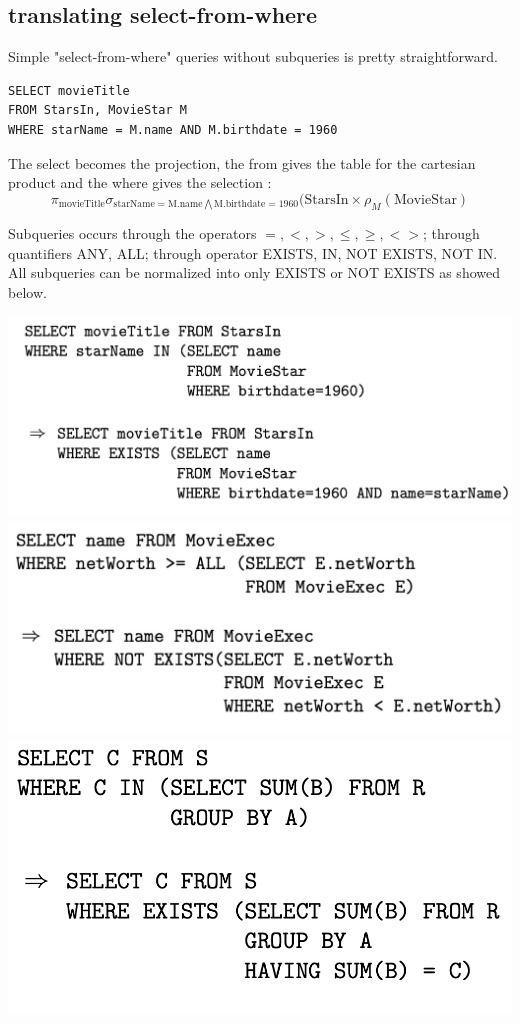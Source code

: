 \documentclass[12pt,a4paper]{article}
\begin{document}
\subsection{translating select-from-where}
Simple "select-from-where" queries without subqueries is pretty straightforward.
\begin{verbatim}
SELECT movieTitle
FROM StarsIn, MovieStar M
WHERE starName = M.name AND M.birthdate = 1960
\end{verbatim}
The select becomes the projection, the from gives the table for the cartesian product and the where gives the selection :
$$\pi_{\text{movieTitle}}\sigma_{\text{starName}=\text{M.name}\bigwedge \text{M.birthdate}=1960}(\text{StarsIn} \times \rho_M (\text{MovieStar})$$

Subqueries occurs through the operators $=,<,>,\leqslant, \geqslant, <>$; through quantifiers ANY, ALL; through operator EXISTS, IN, NOT EXISTS, NOT IN.\\
All subqueries can be normalized into only EXISTS or NOT EXISTS as showed below.
\begin{center}
	\includegraphics[scale=0.4]{img/img16.png}
	\includegraphics[scale=0.4]{img/img17.png}
	\includegraphics[scale=0.4]{img/img18.png}
\end{center}
\end{document}
